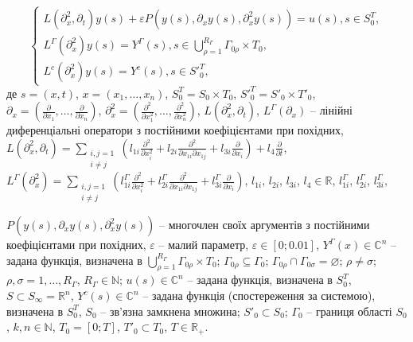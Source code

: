 \begin{equation}
    \label{eq:small_parameter_common_system_with_no_init_condition}
    \left\{
        \begin{alignedat}{2}
            L(\partial_x^2, \partial_t)y(s) + \varepsilon P(y(s), \partial_x y(s), \partial_x^2 y(s)) = u(s), s\in S_{0}^T, \\
            L^{\Gamma}(\partial^{2}_{x})y(s) = Y^{\Gamma}(s),s\in\bigcup\limits_{\rho=1}^{R_{\Gamma}} \Gamma_{0\rho}\times T_{0}, \\
            L^{c}(\partial^{2}_{x})y(s) = Y^{c}(s), s\in {S'}_{0}^T,
        \end{alignedat}
    \right.
\end{equation}
де $s=(x,t)$, $x=(x_{1},\dots,x_{n})$, $S_{0}^{T}=S_{0}\times T_{0}$, ${S'}_{0}^{T}={S'}_{0}\times {T'}_{0}$,
$\partial_{x}=\left(\frac{\partial}{\partial x_{1}}, \dots, \frac{\partial}{\partial x_{n}} \right)$,
$\partial^{2}_{x}=\left(\frac{\partial^{2}}{\partial x^{2}_{1}}, \dots, \frac{\partial^{2}}{\partial x^{2}_{n}} \right)$,
$L(\partial_x^2, \partial_t)$, $L^{\Gamma}(\partial_{x})$ -- лінійні диференціальні оператори з постійними коефіцієнтами при похідних,
$
L(\partial_x^2, \partial_t)=\sum\limits_{ \substack{i,j=1\\ i\neq j}}\left(l_{1i} \frac{\partial^2}{\partial x^2_i} +
l_{2i}\frac{\partial^2}{\partial x_{1i}
    \partial x_{1j}} + l_{3i} \frac{\partial}{\partial x_i} \right) + l_4 \frac{\partial}{\partial t}
$,
$
L^{\Gamma}(\partial_x^2)=\sum\limits_{ \substack{i,j=1\\ i\neq j}}\left(l^{\Gamma}_{1i} \frac{\partial^2}{\partial x^2_i} +
l^{\Gamma}_{2i}\frac{\partial^2}{\partial x_{1i}
    \partial x_{1j}} + l^{\Gamma}_{3i} \frac{\partial}{\partial x_i} \right)
$,
$l_{1i}$, $l_{2i}$, $l_{3i}$, $l_{4}\in\mathbb{R}$,
$l^{\Gamma}_{1i}$, $l^{\Gamma}_{2i}$, $l^{\Gamma}_{3i}$,

$P(y(s), \partial_x y(s), \partial_x^2 y(s))$ -- многочлен своїх аргументів з постійними
коефіцієнтами при похідних, $\varepsilon$ – малий параметр, $\varepsilon\in [0; 0.01]$,
$Y^{\Gamma}(x)\in\mathbb{C}^n$ -- задана функція, визначена в
$\bigcup\limits_{\rho=1}^{R_{\Gamma}}\Gamma_{0\rho}\times T_{0}$;
$\Gamma_{0\rho}\subseteq \Gamma_{0}$; $\Gamma_{0\rho}\cap\Gamma_{0\sigma} = \varnothing$;
$\rho\neq\sigma$; $\rho,\sigma = 1,\dots,R_{\Gamma}$, $R_{\Gamma}\in\mathbb{N}$; $u(s)\in\mathbb{C}^n$ --
задана функція, визначена в $S_{0}^{T}$, $S\subset S_{\infty}=\mathbb{R}^{n}$, $Y^{c}(s)\in\mathbb{C}^n$ -- задана функція (спостереження за системою), визначена в $S_{0}^{T}$,
$S_{0}$ -- зв'язна замкнена множина; ${S'}_{0}\subset S_{0}$; $\Gamma_{0}$ -- границя області $S_{0}$,
$k,n\in\mathbb{N}$, $T_{0}=[0;T]$, ${T'}_{0}\subset T_{0}$, $T\in\mathbb{R}_{+}$.

